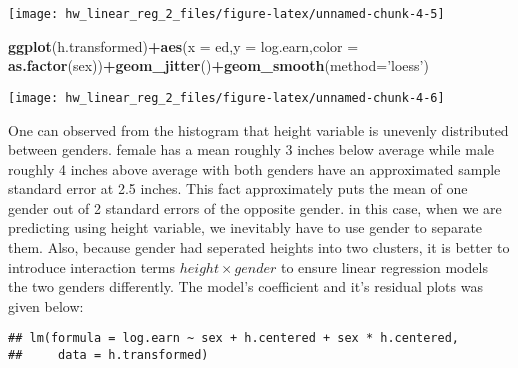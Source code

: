 \documentclass[]{article}
\newenvironment{Shaded}{\begin{snugshade}}{\end{snugshade}}
\newcommand{\DataTypeTok}[1]{\textcolor[rgb]{0.13,0.29,0.53}{#1}}
\newcommand{\KeywordTok}[1]{\textcolor[rgb]{0.13,0.29,0.53}{\textbf{#1}}}
\newcommand{\NormalTok}[1]{#1}
\newcommand{\OperatorTok}[1]{\textcolor[rgb]{0.81,0.36,0.00}{\textbf{#1}}}
\newcommand{\StringTok}[1]{\textcolor[rgb]{0.31,0.60,0.02}{#1}}
\begin{document}
\begin{center}\texttt{[image: hw\_linear\_reg\_2\_files/figure-latex/unnamed-chunk-4-5]} \end{center}

\begin{Shaded}
\begin{Highlighting}[]
\KeywordTok{ggplot}\NormalTok{(h.transformed)}\OperatorTok{+}\KeywordTok{aes}\NormalTok{(}\DataTypeTok{x =}\NormalTok{ ed,}\DataTypeTok{y =}\NormalTok{ log.earn,}\DataTypeTok{color =} \KeywordTok{as.factor}\NormalTok{(sex))}\OperatorTok{+}\KeywordTok{geom_jitter}\NormalTok{()}\OperatorTok{+}\KeywordTok{geom_smooth}\NormalTok{(}\DataTypeTok{method=}\StringTok{'loess'}\NormalTok{)}
\end{Highlighting}
\end{Shaded}

\begin{center}\texttt{[image: hw\_linear\_reg\_2\_files/figure-latex/unnamed-chunk-4-6]} \end{center}

One can observed from the histogram that height variable is unevenly
distributed between genders. female has a mean roughly 3 inches below
average while male roughly 4 inches above average with both genders have
an approximated sample standard error at 2.5 inches. This fact
approximately puts the mean of one gender out of 2 standard errors of
the opposite gender. in this case, when we are predicting using height
variable, we inevitably have to use gender to separate them. Also,
because gender had seperated heights into two clusters, it is better to
introduce interaction terms \(height \times gender\) to ensure linear
regression models the two genders differently. \newline The model's
coefficient and it's residual plots was given below:\newline

\begin{Shaded}
\end{Shaded}

\begin{verbatim}
## lm(formula = log.earn ~ sex + h.centered + sex * h.centered, 
##     data = h.transformed)
\end{verbatim}
\end{document}
